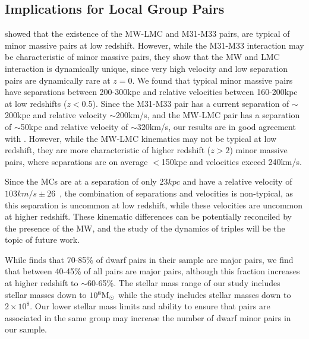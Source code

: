 \documentclass[twocolumn]{aastex63}
\newcommand\msun{\rm{M}_{\odot}}
\begin{document}
\subsection{Implications for Local Group Pairs}\label{sec:LGimplications}
\citet{patel17a} showed that the existence of the MW-LMC and M31-M33 pairs, are typical of minor massive pairs at low redshift. However, while the M31-M33 interaction may be characteristic of minor massive pairs, they show that the MW and LMC interaction is dynamically unique, since very high velocity and low separation pairs are dynamically rare at $z=0$. We found that typical minor massive pairs have separations between 200-300kpc and relative velocities between 160-200kpc at low redshifts ($z<$0.5). Since the M31-M33 pair has a current separation of $\sim$200kpc and relative velocity $\sim$200km/s, and the MW-LMC pair has a separation of $\sim$50kpc and relative velocity of $\sim$320km/s, our results are in good agreement with \citet{patel17a}. However, while the MW-LMC kinematics may not be typical at low redshift, they are more characteristic of higher redshift ($z>2$) minor massive pairs, where separations are on average $<$150kpc and velocities exceed 240km/s.

Since the MCs are at a separation of only $23kpc$ and have a relative velocity of $103km/s \pm26$~\cite{zivick18}, the combination of separations and velocities is non-typical, as this separation is uncommon at low redshift, while these velocities are uncommon at higher redshift. These kinematic differences can be potentially reconciled by the presence of the MW, and the study of the dynamics of triples will be the topic of future work. 




While \citet{besla18} finds that 70-85\% of dwarf pairs in their sample are major pairs, we find that between 40-45\% of all pairs are major pairs, although this fraction increases at higher redshift to $\sim$60-65\%. The stellar mass range of our study includes stellar masses down to $10^8\msun$ while the \citet[]{besla18} study includes stellar masses down to $2\times10^8$. Our lower stellar mass limits and ability to ensure that pairs are associated in the same group may increase the number of dwarf minor pairs in our sample. 
\end{document}
